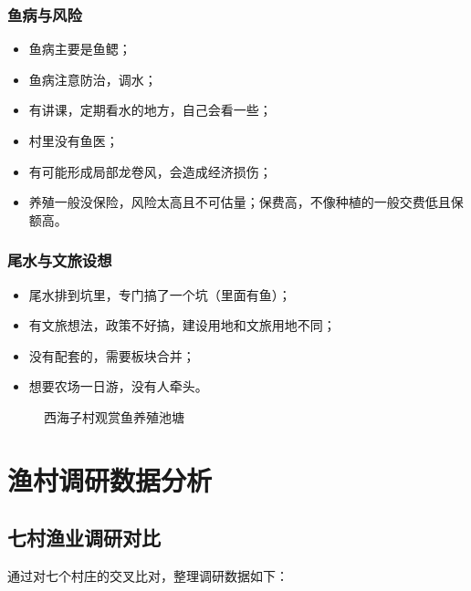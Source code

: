 \documentclass[12pt,a4paper]{article}
\begin{document}
\subsubsection{鱼病与风险}

\begin{itemize}[leftmargin=2em]
    \item 鱼病主要是鱼鳃；
    \item 鱼病注意防治，调水；
    \item 有讲课，定期看水的地方，自己会看一些；
    \item 村里没有鱼医；
    \item 有可能形成局部龙卷风，会造成经济损伤；
    \item 养殖一般没保险，风险太高且不可估量；保费高，不像种植的一般交费低且保额高。
\end{itemize}

\subsubsection{尾水与文旅设想}

\begin{itemize}[leftmargin=2em]
    \item 尾水排到坑里，专门搞了一个坑（里面有鱼）；
    \item 有文旅想法，政策不好搞，建设用地和文旅用地不同；
    \item 没有配套的，需要板块合并；
    \item 想要农场一日游，没有人牵头。
\end{itemize}

\begin{figure}[H]
\centering
{}
\caption{西海子村观赏鱼养殖池塘}
\end{figure}

\section{渔村调研数据分析}

\subsection{七村渔业调研对比}

通过对七个村庄的交叉比对，整理调研数据如下：
\end{document}
